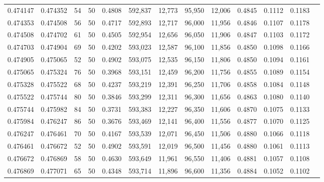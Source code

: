 \begin{tabular}{rrrrrrrrrrrrr}
0.474147 & 0.474352 &    54 &  50 &                                     0.4808 & 592,837 &  12,773 &  95,950 &  12,006 & 0.4845 & 0.1112 & 0.1183 \\
0.474353 & 0.474508 &    56 &  50 &                                     0.4717 & 592,893 &  12,717 &  96,000 &  11,956 & 0.4846 & 0.1107 & 0.1178 \\
0.474508 & 0.474702 &    61 &  50 &                                     0.4505 & 592,954 &  12,656 &  96,050 &  11,906 & 0.4847 & 0.1103 & 0.1172 \\
0.474703 & 0.474904 &    69 &  50 &                                     0.4202 & 593,023 &  12,587 &  96,100 &  11,856 & 0.4850 & 0.1098 & 0.1166 \\
0.474905 & 0.475065 &    52 &  50 &                                     0.4902 & 593,075 &  12,535 &  96,150 &  11,806 & 0.4850 & 0.1094 & 0.1161 \\
0.475065 & 0.475324 &    76 &  50 &                                     0.3968 & 593,151 &  12,459 &  96,200 &  11,756 & 0.4855 & 0.1089 & 0.1154 \\
0.475328 & 0.475522 &    68 &  50 &                                     0.4237 & 593,219 &  12,391 &  96,250 &  11,706 & 0.4858 & 0.1084 & 0.1148 \\
0.475522 & 0.475744 &    80 &  50 &                                     0.3846 & 593,299 &  12,311 &  96,300 &  11,656 & 0.4863 & 0.1080 & 0.1140 \\
0.475744 & 0.475982 &    84 &  50 &                                     0.3731 & 593,383 &  12,227 &  96,350 &  11,606 & 0.4870 & 0.1075 & 0.1133 \\
0.475984 & 0.476247 &    86 &  50 &                                     0.3676 & 593,469 &  12,141 &  96,400 &  11,556 & 0.4877 & 0.1070 & 0.1125 \\
0.476247 & 0.476461 &    70 &  50 &                                     0.4167 & 593,539 &  12,071 &  96,450 &  11,506 & 0.4880 & 0.1066 & 0.1118 \\
0.476461 & 0.476672 &    52 &  50 &                                     0.4902 & 593,591 &  12,019 &  96,500 &  11,456 & 0.4880 & 0.1061 & 0.1113 \\
0.476672 & 0.476869 &    58 &  50 &                                     0.4630 & 593,649 &  11,961 &  96,550 &  11,406 & 0.4881 & 0.1057 & 0.1108 \\
0.476869 & 0.477071 &    65 &  50 &                                     0.4348 & 593,714 &  11,896 &  96,600 &  11,356 & 0.4884 & 0.1052 & 0.1102 \\

\end{tabular}
